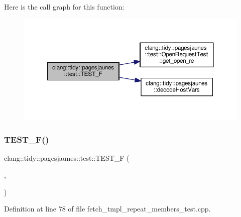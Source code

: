 Here is the call graph for this function\+:
\nopagebreak
\begin{figure}[H]
\begin{center}
\leavevmode
\includegraphics[width=350pt]{namespaceclang_1_1tidy_1_1pagesjaunes_1_1test_a7afb641ccb9e19a037895b9246bfeeb5_cgraph}
\end{center}
\end{figure}
\mbox{\label{namespaceclang_1_1tidy_1_1pagesjaunes_1_1test_abf1aca281ebebf3e7b6dec0e2dd308d1}} 
\subsubsection{\texorpdfstring{T\+E\+S\+T\+\_\+\+F()}{TEST\_F()}\hspace{0.1cm}{\footnotesize\ttfamily [18/57]}}
{\footnotesize\ttfamily clang\+::tidy\+::pagesjaunes\+::test\+::\+T\+E\+S\+T\+\_\+F (\begin{DoxyParamCaption}\item[{\hyperlink{classclang_1_1tidy_1_1pagesjaunes_1_1test_1_1_fetch_tmpl_repeat_members_test}{Fetch\+Tmpl\+Repeat\+Members\+Test}}]{,  }\item[{Templ\+Repeat\+Members\+Regex\+More\+Blank\+Matching}]{ }\end{DoxyParamCaption})}



Definition at line 78 of file fetch\+\_\+tmpl\+\_\+repeat\+\_\+members\+\_\+test.\+cpp.

